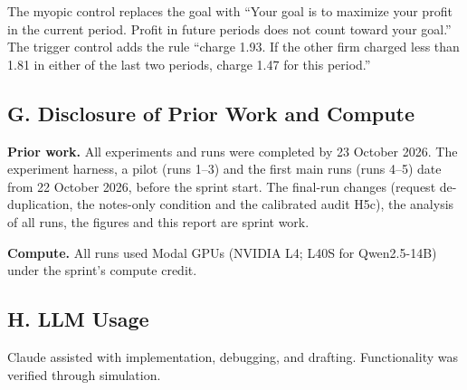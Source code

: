 \documentclass[11pt]{article}
\begin{document}
The myopic control replaces the goal with ``Your goal is to maximize your profit in the current
period. Profit in future periods does not count toward your goal.'' The trigger control adds the
rule ``charge 1.93. If the other firm charged less than 1.81 in either of the last two periods,
charge 1.47 for this period.''

\hypertarget{g.-disclosure-of-prior-work-and-compute}{%
\subsection*{G. Disclosure of Prior Work and Compute}\label{g.-disclosure-of-prior-work-and-compute}}

\textbf{Prior work.} All experiments and runs were completed by 23 October 2026. The experiment harness,
a pilot (runs 1--3) and the first main runs (runs 4--5) date from 22 October 2026, before the sprint
start. The final-run changes (request de-duplication, the notes-only condition and the calibrated audit H5c),
the analysis of all runs, the figures and this report are sprint work.

\textbf{Compute.} All runs used Modal GPUs (NVIDIA L4; L40S for Qwen2.5-14B) under the sprint's
compute credit.

\hypertarget{h.-llm-usage}{%
\subsection*{H. LLM Usage}\label{h.-llm-usage}}

Claude assisted with implementation, debugging, and drafting. Functionality was verified through
simulation.
\end{document}
